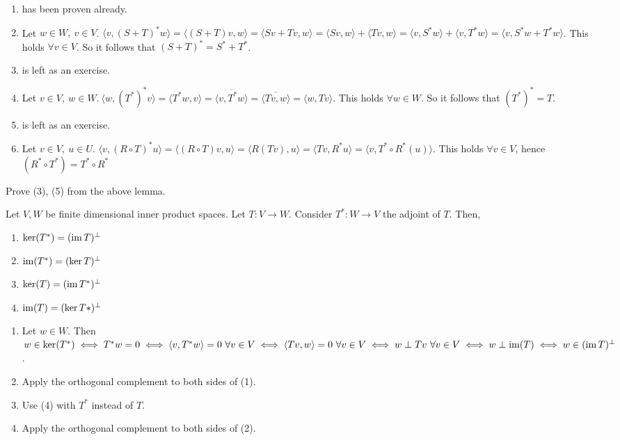 \documentclass[12pt]{article}
\begin{document}
\begin{proofbox}
    \begin{enumerate}
        \item has been proven already.
        \item Let $w \in W, \ v \in V$. $\langle v, (S + T)^* w \rangle = \langle (S + T) v, w \rangle = \langle Sv + Tv, w \rangle = \langle Sv, w \rangle + \langle Tv, w \rangle = \langle v, S^* w \rangle + \langle v, T^* w \rangle = \langle v, S^* w + T^* w \rangle$. This holds $\forall v \in V$. So it follows that $(S + T)^* = S^* + T^*$.
        \item is left as an exercise.
        \item Let $v \in V,\ w \in W.\ \langle w, (T^*)^* v \rangle = \langle T^* w, v \rangle = \overline{\langle v, T^* w \rangle} = \overline{\langle Tv, w \rangle} = \langle w, Tv \rangle$. This holds $\forall w \in W$. So it follows that $(T^*)^* = T$.
        \item is left as an exercise.
        \item Let $v \in V,\ u \in U$. $\langle v, (R \circ T)^* u \rangle = \langle (R \circ T)v, u \rangle = \langle R(Tv), u \rangle = \langle Tv, R^*u \rangle = \langle v, T^* \circ R^*(u) \rangle$. This holds $\forall v \in V$, hence $(R^* \circ T^*) = T^* \circ R^*$
    \end{enumerate}
\end{proofbox}

\begin{exercise}{}{}
    Prove (3), (5) from the above lemma.
\end{exercise}

\begin{lemma}{}{}
    Let $V, W$ be finite dimensional inner product spaces. Let $T: V \rightarrow W$. Consider $T^*: W \rightarrow V$ the adjoint of $T$. Then,
    \begin{enumerate}
        \item $\ker(T^*) = (\operatorname{im} T)^\perp$
        \item $\operatorname{im}(T^*) = (\ker T)^\perp$
        \item $\ker(T) = (\operatorname{im} T^*)^\perp$
        \item $\operatorname{im}(T) = (\ker T*)^\perp$
    \end{enumerate}
\end{lemma}

\begin{proofbox}
    \begin{enumerate}
        \item Let $w \in W$. Then $w \in \ker (T^*) \iff T^* w = 0 \iff \langle v, T^* w \rangle = 0 \ \forall v \in V \iff \langle T v, w \rangle = 0 \ \forall v \in V \iff w \perp T v \ \forall v \in V \iff w \perp \operatorname{im}(T) \iff w \in (\operatorname{im} T)^\perp$.
        \item[4.] Apply the orthogonal complement to both sides of (1).
        \item[2.] Use (4) with $T^*$ instead of $T$.
        \item[3.] Apply the orthogonal complement to both sides of (2).
    \end{enumerate}
\end{proofbox}
\end{document}
